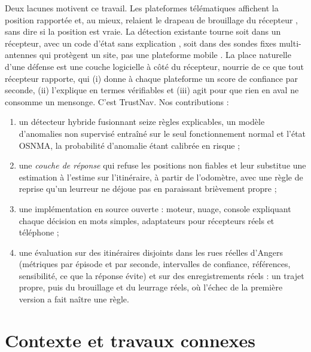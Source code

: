 \documentclass[conference]{IEEEtran}
\newcommand{\sys}{TrustNav}
\begin{document}
Deux lacunes motivent ce travail. Les plateformes télématiques affichent la position rapportée et, au mieux, relaient le drapeau de brouillage du récepteur \cite{geotab2025}, sans dire si la position est vraie. La détection existante tourne soit dans un récepteur, avec un code d'état sans explication \cite{ublox2024,septentrio2025}, soit dans des sondes fixes multi-antennes qui protègent un site, pas une plateforme mobile \cite{gpspatron}. La place naturelle d'une défense est une couche logicielle à côté du récepteur, nourrie de ce que tout récepteur rapporte, qui (i) donne à chaque plateforme un score de confiance par seconde, (ii) l'explique en termes vérifiables et (iii) agit pour que rien en aval ne consomme un mensonge. C'est \sys. Nos contributions :
\begin{enumerate}
\item un détecteur hybride fusionnant seize règles explicables, un modèle d'anomalies non supervisé entraîné sur le seul fonctionnement normal et l'état OSNMA, la probabilité d'anomalie étant calibrée en risque ;
\item une \emph{couche de réponse} qui refuse les positions non fiables et leur substitue une estimation à l'estime sur l'itinéraire, à partir de l'odomètre, avec une règle de reprise qu'un leurreur ne déjoue pas en paraissant brièvement propre ;
\item une implémentation en source ouverte : moteur, nuage, console expliquant chaque décision en mots simples, adaptateurs pour récepteurs réels et téléphone ;
\item une évaluation sur des itinéraires disjoints dans les rues réelles d'Angers (métriques par épisode et par seconde, intervalles de confiance, références, sensibilité, ce que la réponse évite) et sur des enregistrements réels : un trajet propre, puis du brouillage et du leurrage réels, où l'échec de la première version a fait naître une règle.
\end{enumerate}

\section{Contexte et travaux connexes}\label{sec:related}
\end{document}
